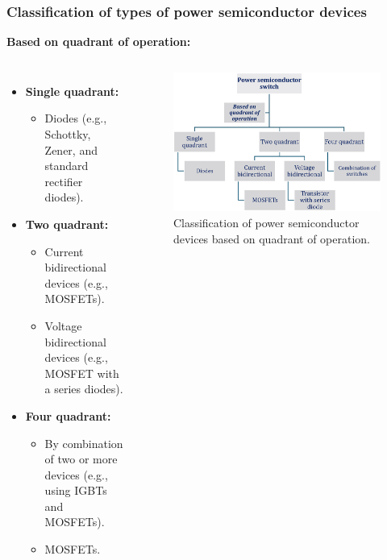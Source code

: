 \begin{frame}
	\frametitle{Classification of types of power semiconductor devices}
    \textbf{Based on quadrant of operation:}
    \begin{columns}
        \begin{itemize}
            \item \textbf{Single quadrant:}
            \begin{itemize}
                \item Diodes (e.g., Schottky, Zener, and standard rectifier diodes).
            \end{itemize}
            \item \textbf{Two quadrant:}
            \begin{itemize}
                \item Current bidirectional devices (e.g., MOSFETs).
                \item Voltage bidirectional devices (e.g., MOSFET with a series diodes).
            \end{itemize}
            \item \textbf{Four quadrant:}
            \begin{itemize}
                \item By combination of two or more devices (e.g., using IGBTs and MOSFETs).
                \item MOSFETs.
            \end{itemize}
        \end{itemize}

        \begin{figure}
            \centering
            \label{fig:Classification_based_on_quadrant_of_operation}
            \includegraphics[scale=0.35]{fig/lec04/classification_of_device_4.eps}
            \caption{Classification of power semiconductor devices based on quadrant of operation.}
        \end{figure}
    \end{columns}
\end{frame}

